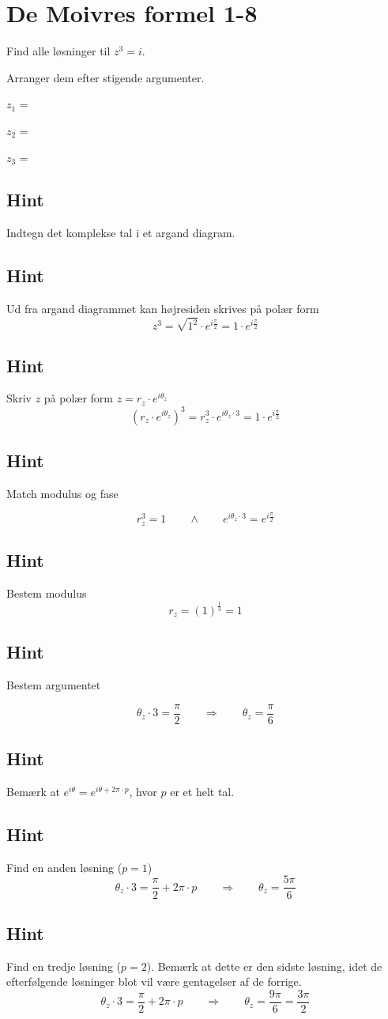\documentclass{article}
\newenvironment{exercise}[1]{\newpage\section{#1}}{}
\newcommand{\answerbox}[1]{\fbox{$#1$}}
\newcommand{\hint}{\subsection*{Hint}}
\begin{document}
\begin{exercise}{De Moivres formel 1-8}

Find alle løsninger til $z^3=i$. 

Arranger dem efter stigende argumenter.

$z_1$ = \answerbox{e^{i \frac{\pi}{6}}}		

$z_2$ = \answerbox{e^{i \frac{5\pi}{6}}}		

$z_3$ = \answerbox{e^{i \frac{3\pi}{2}}}		


\hint 

Indtegn det komplekse tal i et argand diagram. 

\hint 

Ud fra argand diagrammet kan højresiden skrives på polær form
\[
z^3 = \sqrt{1^2} \cdot e^{i \frac{\pi}{2}} = 1 \cdot e^{i \frac{\pi}{2}} 
\]


\hint

Skriv $z$ på polær form $z = r_z \cdot e^{i \theta_z}$
\[
\left(r_z \cdot e^{i \theta_z}\right)^3 = r_z^3 \cdot e^{i \theta_z \cdot 3} = 1 \cdot e^{i \frac{\pi}{2}} 
\]

\hint 
Match modulus og fase

\[
r_z^3 = 1 \qquad \wedge \qquad e^{i \theta_z \cdot 3} = e^{i \frac{\pi}{2}} 
\]

\hint

Bestem modulus
\[
r_z  =  \left(1 \right)^{\frac{1}{3}} = 1
\]

\hint

Bestem argumentet

\[
\theta_z \cdot 3 = \frac{\pi}{2} \qquad \Rightarrow \qquad  \theta_z = \frac{\pi}{6}
\]

\hint

Bemærk at $e^{i \theta} = e^{i \theta + 2 \pi \cdot p}$, hvor $p$ er et helt tal.

\hint

Find en anden løsning ($p=1$)
\[
\theta_z \cdot 3 = \frac{\pi}{2}  + 2 \pi \cdot p \qquad \Rightarrow \qquad  \theta_z = \frac{5 \pi}{6}
\]

\hint

Find en tredje løsning ($p=2$). 
Bemærk at dette er den sidste løsning, idet de efterfølgende 
løsninger blot vil være gentagelser af de forrige.
\[
\theta_z \cdot 3 =  \frac{\pi}{2}  + 2 \pi \cdot p \qquad \Rightarrow  \qquad  \theta_z = \frac{9 \pi}{6} = \frac{3 \pi}{2}
\]


\end{exercise}

\newpage
\end{document}
